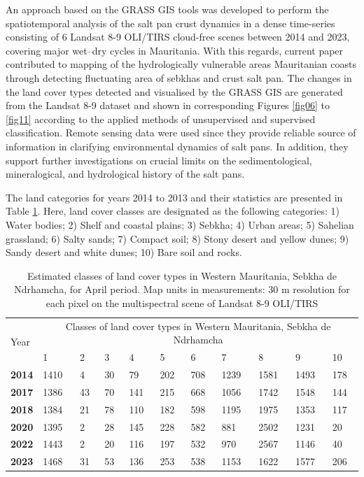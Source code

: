 \documentclass[12pt,a4paper,oneside]{article}
\def \newpar{\vspace{6pt}}
\begin{document}
\newpar An approach based on the GRASS GIS tools was developed to perform the spatiotemporal analysis of the salt pan crust dynamics in a dense time-series consisting of 6 Landsat 8-9 OLI/TIRS cloud-free scenes between 2014 and 2023, covering major wet--dry cycles in Mauritania. With this regards, current paper contributed to mapping of the hydrologically vulnerable  areas Mauritanian coasts through detecting fluctuating area of sebkhas and crust salt pan. The changes in the land cover types detected and visualised by the GRASS GIS are generated from the Landsat 8-9 dataset and shown in corresponding Figures \ref{fig06} to \ref{fig11} according to the applied methods of unsupervised and supervised classification. Remote sensing data were used since they provide reliable source of information in clarifying  environmental dynamics of salt pans. In addition, they support further investigations on crucial limits on the sedimentological, mineralogical, and hydrological history of the salt pans.

\newpar The land categories for\hl{ }years 2014 to 2013 and their statistics are presented in Table \ref{tab3}. Here,\hl{ }land cover classes are designated as the following categories: 1) Water bodies; 2) Shelf and coastal plains; 3) Sebkha; 4) Urban areas; 5) Sahelian grassland; 6) Salty sands; 7) Compact soil; 8) Stony desert and yellow dunes; 9) Sandy desert and white dunes; 10) Bare soil and rocks. 

\begin{table}[H]
\caption{Estimated classes of land cover types in Western Mauritania, Sebkha de Ndrhamcha, for April period. Map units in measurements: 30 m resolution for each pixel on the multispectral scene of Landsat 8-9 OLI/TIRS}
  \centering
  \begin{tabularx}{\textwidth}{p{0.9cm}p{0.9cm}p{0.9cm}p{0.9cm}p{0.9cm}p{0.9cm}p{0.9cm}p{0.9cm}p{0.9cm}p{0.9cm}p{0.9cm}}
  \toprule
  \multirow{2}{*}{Year} & \multicolumn{10}{c}{Classes of land cover types in Western Mauritania, Sebkha de Ndrhamcha} \\
     & 1 & 2 & 3 & 4 & 5 & 6 & 7 & 8 & 9 & 10 \\
    \midrule
    \textbf{2014} & 1410 & 4 & 30 & 79 & 202 & 708 & 1239 & 1581 & 1493 & 178 \\
    
    \textbf{2017} & 1386 & 43 & 70 & 141 & 215 & 668 & 1056 & 1742 & 1548 & 144 \\
    \textbf{2018} & 1384 & 21 & 78 & 110 & 182 & 598 & 1195 & 1975 & 1353 & 117 \\
    \textbf{2020} & 1395 & 2 & 28 & 145 & 228 & 582 & 881 & 2502 & 1231 & 20 \\
    \textbf{2022} & 1443 & 2 & 20 & 116 & 197 & 532 & 970 & 2567 & 1146 & 40 \\
    \textbf{2023} & 1468 & 31 & 53 & 136 & 253 & 538 & 1153 & 1622 & 1577 & 206 \\
\bottomrule
\end{tabularx}
  \label{tab3}
\end{table}
\end{document}

